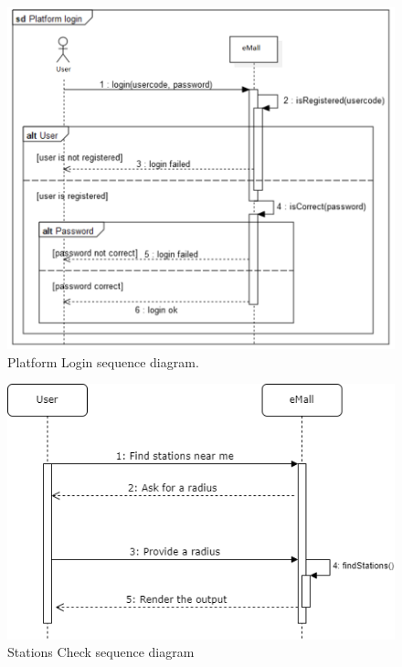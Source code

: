 \documentclass[12pt]{report}
\begin{document}
    \begin{figure}[h]
        \centering
        \includegraphics[width=\textwidth]{assets/platform_login.png}
        \caption{Platform Login sequence diagram.}
    \end{figure}
    
    \begin{figure}[h]
        \centering
        \includegraphics[width=\textwidth]{assets/UC1.png}
        \caption{Stations Check sequence diagram}
    \end{figure}
\end{document}
